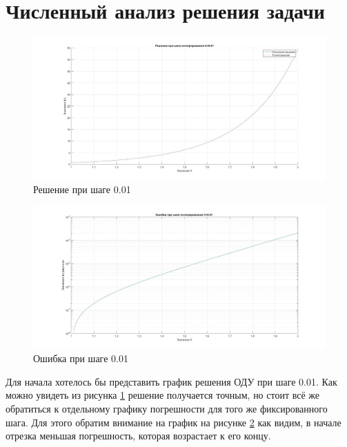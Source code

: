 \documentclass[a4paper]{article}
\begin{document}
\section{Численный анализ решения задачи}

\begin{figure}[h!]
\begin{center}
\includegraphics[scale=0.3]{решение при шаге интегрирования 0.01.jpg} 
\end{center}
\caption{Решение при шаге 0.01} \label{Рис3}
\end{figure}

\begin{figure}[h!]
\begin{center}
\includegraphics[scale=0.3]{ошибка при шаге интегрирования 0.01.jpg} 
\end{center}
\caption{Ошибка при шаге 0.01} \label{Рис4}
\end{figure}

Для начала хотелось бы представить график решения ОДУ при шаге 0.01. Как можно увидеть из рисунка \ref{Рис3} решение получается точным, но стоит всё же обратиться к отдельному графику погрешности для того же фиксированного шага. Для этого обратим внимание на график на рисунке \ref{Рис4} как видим, в начале отрезка меньшая погрешность, которая возрастает к его концу.
\end{document}
